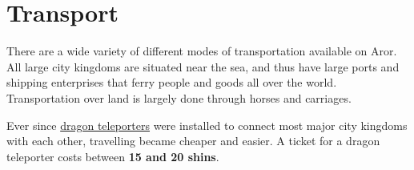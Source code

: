 \section{Transport}
\label{sec:Transport}

There are a wide variety of different modes of transportation available on
Aror. All large city kingdoms are situated near the sea, and thus have large
ports and shipping enterprises that ferry people and goods all over the
world. Transportation over land is largely done through horses and carriages.

Ever since \hyperref[sec:Dragon Teleporter]{dragon teleporters} were installed
to connect most major city kingdoms with each other, travelling became cheaper
and easier. A ticket for a dragon teleporter costs between \textbf{15 and 20
  shins}.


